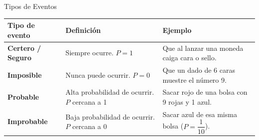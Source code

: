 \documentclass[12pt, letterpaper]{article}
\begin{document}
	\begin{concepto}{Tipos de Eventos}
		\vspace{0.2cm}
		\renewcommand{\arraystretch}{1.7}
		\begin{center}
			\begin{tabular}{|m{3cm}|m{4.5cm}|m{4.5cm}|}
				\hline
				\rowcolor{valblue!25}
				\textbf{Tipo de evento} & \textbf{Definición} & \textbf{Ejemplo} \\
				\hline
				\textbf{Certero / Seguro} &
				Siempre ocurre. $P=1$ &
				Que al lanzar una moneda caiga cara o sello. \\
				\hline
				\textbf{Imposible} &
				Nunca puede ocurrir. $P=0$ &
				Que un dado de 6 caras muestre el número 9. \\
				\hline
				\textbf{Probable} &
				Alta probabilidad de ocurrir. $P$ cercana a 1 &
				Sacar rojo de una bolsa con 9 rojas y 1 azul. \\
				\hline
				\textbf{Improbable} &
				Baja probabilidad de ocurrir. $P$ cercana a 0 &
				Sacar azul de esa misma bolsa ($P=\dfrac{1}{10}$). \\
				\hline
			\end{tabular}
		\end{center}
	\end{concepto}
	
\end{document}
